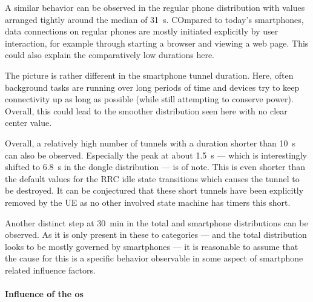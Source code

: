 A similar behavior can be observed in the regular phone distribution with values arranged tightly around the median of \SI{31}{\second}. COmpared to today's smartphones, data connections on regular phones are mostly initiated explicitly by user interaction, for example through starting a browser and viewing a web page. This could also explain the comparatively low durations here.

The picture is rather different in the smartphone tunnel duration. Here, often background tasks are running over long periods of time and devices try to keep connectivity up as long as possible (while still attempting to conserve power). Overall, this could lead to the smoother distribution seen here with no clear center value.

Overall, a relatively high number of tunnels with a duration shorter than \SI{10}{\second} can also be observed. Especially the peak at about \SI{1.5}{\second} --- which is interestingly shifted to \SI{6.8}{\second} in the dongle distribution --- is of note. This is even shorter than the default values for the \gls{RRC} idle state transitions which causes the tunnel to be destroyed. It can be conjectured that these short tunnels have been explicitly removed by the \gls{UE} as no other involved state machine has timers this short.

Another distinct step at \SI{30}{\minute} in the total and smartphone distributions can be observed. As it is only present in these to categories --- and the total distribution looks to be mostly governed by smartphones --- it is reasonable to assume that the cause for this is a specific behavior observable in some aspect of smartphone related influence factors.


\paragraph{Influence of the \texorpdfstring{\acrshort{os}}{OS}}

